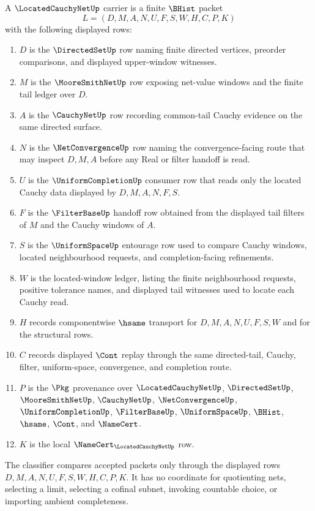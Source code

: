 \begin{definition}
\label{def:located-cauchy-net-carrier}
A $\LocatedCauchyNetUp$ carrier is a finite $\BHist$ packet
$$
L=(D,M,A,N,U,F,S,W,H,C,P,K)
$$
with the following displayed rows:
\begin{enumerate}
\item $D$ is the $\DirectedSetUp$ row naming finite directed vertices, preorder comparisons, and displayed upper-window witnesses.
\item $M$ is the $\MooreSmithNetUp$ row exposing net-value windows and the finite tail ledger over $D$.
\item $A$ is the $\CauchyNetUp$ row recording common-tail Cauchy evidence on the same directed surface.
\item $N$ is the $\NetConvergenceUp$ row naming the convergence-facing route that may inspect $D,M,A$ before any Real or filter handoff is read.
\item $U$ is the $\UniformCompletionUp$ consumer row that reads only the located Cauchy data displayed by $D,M,A,N,F,S$.
\item $F$ is the $\FilterBaseUp$ handoff row obtained from the displayed tail filters of $M$ and the Cauchy windows of $A$.
\item $S$ is the $\UniformSpaceUp$ entourage row used to compare Cauchy windows, located neighbourhood requests, and completion-facing refinements.
\item $W$ is the located-window ledger, listing the finite neighbourhood requests, positive tolerance names, and displayed tail witnesses used to locate each Cauchy read.
\item $H$ records componentwise $\hsame$ transport for $D,M,A,N,U,F,S,W$ and for the structural rows.
\item $C$ records displayed $\Cont$ replay through the same directed-tail, Cauchy, filter, uniform-space, convergence, and completion route.
\item $P$ is the $\Pkg$ provenance over $\LocatedCauchyNetUp$, $\DirectedSetUp$, $\MooreSmithNetUp$, $\CauchyNetUp$, $\NetConvergenceUp$, $\UniformCompletionUp$, $\FilterBaseUp$, $\UniformSpaceUp$, $\BHist$, $\hsame$, $\Cont$, and $\NameCert$.
\item $K$ is the local $\NameCert_{\LocatedCauchyNetUp}$ row.
\end{enumerate}
The classifier compares accepted packets only through the displayed rows $D,M,A,N,U,F,S,W,H,C,P,K$. It has no coordinate for quotienting nets, selecting a limit, selecting a cofinal subnet, invoking countable choice, or importing ambient completeness.
\end{definition}

